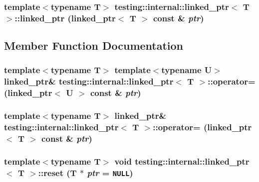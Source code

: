 \subsubsection{\setlength{\rightskip}{0pt plus 5cm}template$<$typename T$>$ {\bf testing::internal::linked\_\-ptr}$<$ T $>$::{\bf linked\_\-ptr} ({\bf linked\_\-ptr}$<$ T $>$ const \& {\em ptr})\hspace{0.3cm}{\tt  [inline]}}\label{classtesting_1_1internal_1_1linked__ptr_3f2f41e3f81027fc746646b84f931883}




\subsection{Member Function Documentation}
\subsubsection{\setlength{\rightskip}{0pt plus 5cm}template$<$typename T$>$ template$<$typename U$>$ {\bf linked\_\-ptr}\& {\bf testing::internal::linked\_\-ptr}$<$ T $>$::operator= ({\bf linked\_\-ptr}$<$ U $>$ const \& {\em ptr})\hspace{0.3cm}{\tt  [inline]}}\label{classtesting_1_1internal_1_1linked__ptr_9063b35923382bd9c62dae820c6a8b58}


\subsubsection{\setlength{\rightskip}{0pt plus 5cm}template$<$typename T$>$ {\bf linked\_\-ptr}\& {\bf testing::internal::linked\_\-ptr}$<$ T $>$::operator= ({\bf linked\_\-ptr}$<$ T $>$ const \& {\em ptr})\hspace{0.3cm}{\tt  [inline]}}\label{classtesting_1_1internal_1_1linked__ptr_62fc8f5deb899d1ad33b0af1eef9e1e5}


\subsubsection{\setlength{\rightskip}{0pt plus 5cm}template$<$typename T$>$ void {\bf testing::internal::linked\_\-ptr}$<$ T $>$::reset (T $\ast$ {\em ptr} = {\tt NULL})\hspace{0.3cm}{\tt  [inline]}}\label{classtesting_1_1internal_1_1linked__ptr_2b836129776f7700f37b90f0890fb46c}


